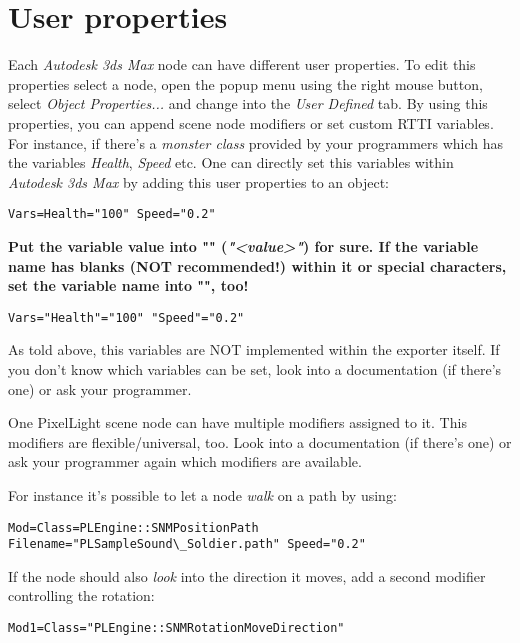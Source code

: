 \chapter{User properties}
Each \emph{Autodesk 3ds Max} node can have different user properties. To edit this properties select a node, open the popup menu using the right mouse button, select \emph{Object Properties...} and change into the \emph{User Defined} tab. By using this properties, you can append scene node modifiers or set custom RTTI variables. For instance, if there's a \emph{monster class} provided by your programmers which has the variables \emph{Health}, \emph{Speed} etc. One can directly set this variables within \emph{Autodesk 3ds Max} by adding this user properties to an object:

\begin{lstlisting}[caption=Setting scene node variables]
Vars=Health="100" Speed="0.2"
\end{lstlisting}

\textbf{Put the variable value into "" (\emph{"<value>"}) for sure. If the variable name has blanks (NOT recommended!) within it or special characters, set the variable name into "", too!}

\begin{lstlisting}[caption=Setting scene node variables safely]
Vars="Health"="100" "Speed"="0.2"
\end{lstlisting}

As told above, this variables are NOT implemented within the exporter itself. If you don't know which variables can be set, look into a documentation (if there's one) or ask your programmer.

One PixelLight scene node can have multiple modifiers assigned to it. This modifiers are flexible/universal, too. Look into a documentation (if there's one) or ask your programmer again which modifiers are available.

For instance it's possible to let a node \emph{walk} on a path by using:

\begin{lstlisting}[caption=Path scene node modifier]
Mod=Class=PLEngine::SNMPositionPath Filename="PLSampleSound\_Soldier.path" Speed="0.2"
\end{lstlisting}

If the node should also \emph{look} into the direction it moves, add a second modifier controlling the rotation:

\begin{lstlisting}[caption=Look into movement direction scene node modifier]
Mod1=Class="PLEngine::SNMRotationMoveDirection"
\end{lstlisting}

